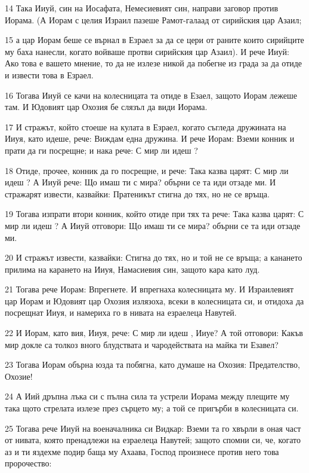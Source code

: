\par 14 Така Ииуй, син на Иосафата, Немесиевият син, направи заговор против Иорама. (А Иорам с целия Израил пазеше Рамот-галаад от сирийския цар Азаил;
\par 15 а цар Иорам беше се върнал в Езраел за да се цери от раните които сирийците му баха нанесли, когато войваше протви сирийския цар Азаил). И рече Ииуй: Ако това е вашето мнение, то да не излезе никой да побегне из града за да отиде и извести това в Езраел.
\par 16 Тогава Ииуй се качи на колесницата та отиде в Езаел, защото Иорам лежеше там. И Юдовият цар Охозия бе слязъл да види Иорама.
\par 17 И стражът, който стоеше на кулата в Езраел, когато съгледа дружината на Ииуя, като идеше, рече: Виждам една дружина. И рече Иорам: Вземи конник и прати да ги посрещне; и нака рече: С мир ли идеш ?
\par 18 Отиде, прочее, конник да го посрещне, и рече: Така казва царят: С мир ли идеш ? А Ииуй рече: Що имаш ти с мира? обърни се та иди отзаде ми. И стражарят извести, казвайки: Пратеникът стигна до тях, но не се връща.
\par 19 Тогава изпрати втори конник, който отиде при тях та рече: Така казва царят: С мир ли идеш ? А Ииуй отговори: Що имаш ти се мира? обърни се та иди отзаде ми.
\par 20 И стражът извести, казвайки: Стигна до тях, но и той не се връща; а канането прилима на карането на Ииуя, Намасиевия син, защото кара като луд.
\par 21 Тогава рече Иорам: Впрегнете. И впрегнаха колесницата му. И Израилевият цар Иорам и Юдовият цар Охозия излязоха, всеки в колесницата си, и отидоха да посрещнат Ииуя, и намериха го в нивата на езраелеца Навутей.
\par 22 И Иорам, като вия, Ииуя, рече: С мир ли идеш , Ииуе? А той отговори: Какъв мир докле са толкоз вного блудствата и чародействата на майка ти Езавел?
\par 23 Тогава Иорам обърна юзда та побягна, като думаше на Охозия: Предателство, Охозие!
\par 24 А Иий дръпна лъка си с пълна сила та устрели Иорама между плещите му така щото стрелата излезе през сърцето му; а той се пригърби в колесницата си.
\par 25 Тогава рече Ииуй на военачалника си Видкар: Вземи та го хвърли в оная част от нивата, която пренадлежи на езраелеца Навутей; защото спомни си, че, когато аз и ти яздехме подир баща му Ахаава, Господ произнесе против него това пророчество:
